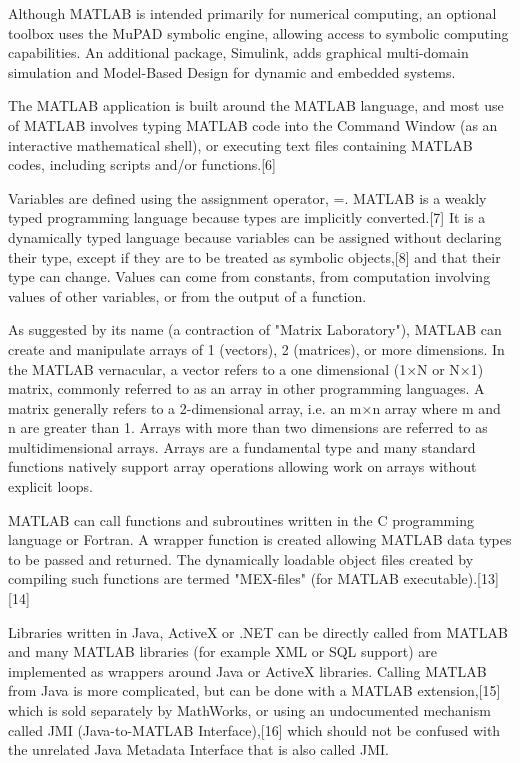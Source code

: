 	\vpara
	Although MATLAB is intended primarily for numerical computing, an optional toolbox uses the MuPAD symbolic engine, allowing access to symbolic computing capabilities. An additional package, Simulink, adds graphical multi-domain simulation and Model-Based Design for dynamic and embedded systems.
	
	\vpara
	The MATLAB application is built around the MATLAB language, and most use of MATLAB involves typing MATLAB code into the Command Window (as an interactive mathematical shell), or executing text files containing MATLAB codes, including scripts and/or functions.[6]
	
	\vpara
	Variables are defined using the assignment operator, =. MATLAB is a weakly typed programming language because types are implicitly converted.[7] It is a dynamically typed language because variables can be assigned without declaring their type, except if they are to be treated as symbolic objects,[8] and that their type can change. Values can come from constants, from computation involving values of other variables, or from the output of a function. 
	
	\vpara
	As suggested by its name (a contraction of "Matrix Laboratory"), MATLAB can create and manipulate arrays of 1 (vectors), 2 (matrices), or more dimensions. In the MATLAB vernacular, a vector refers to a one dimensional (1×N or N×1) matrix, commonly referred to as an array in other programming languages. A matrix generally refers to a 2-dimensional array, i.e. an m×n array where m and n are greater than 1. Arrays with more than two dimensions are referred to as multidimensional arrays. Arrays are a fundamental type and many standard functions natively support array operations allowing work on arrays without explicit loops.
	
	\vpara
	MATLAB can call functions and subroutines written in the C programming language or Fortran. A wrapper function is created allowing MATLAB data types to be passed and returned. The dynamically loadable object files created by compiling such functions are termed "MEX-files" (for MATLAB executable).[13][14]
	
	\vpara
	Libraries written in Java, ActiveX or .NET can be directly called from MATLAB and many MATLAB libraries (for example XML or SQL support) are implemented as wrappers around Java or ActiveX libraries. Calling MATLAB from Java is more complicated, but can be done with a MATLAB extension,[15] which is sold separately by MathWorks, or using an undocumented mechanism called JMI (Java-to-MATLAB Interface),[16] which should not be confused with the unrelated Java Metadata Interface that is also called JMI.
	

